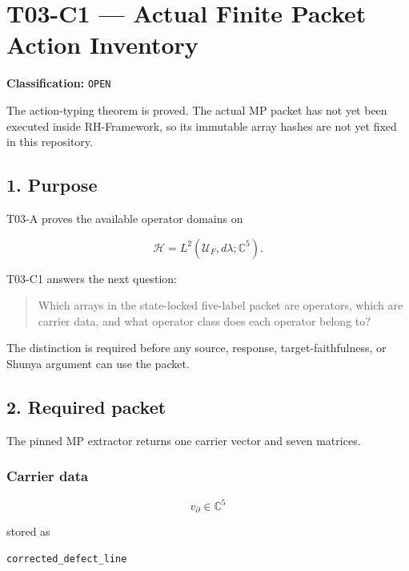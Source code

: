 \hypertarget{t03-c1-actual-finite-packet-action-inventory}{%
\chapter{T03-C1 --- Actual Finite Packet Action Inventory}\label{t03-c1-actual-finite-packet-action-inventory}}

\textbf{Classification:} \texttt{OPEN}

The action-typing theorem is proved. The actual MP packet has not yet been
executed inside RH-Framework, so its immutable array hashes are not yet fixed in
this repository.

\hypertarget{purpose}{%
\section{1. Purpose}\label{purpose}}

T03-A proves the available operator domains on

\[
\mathcal H
=
L^2(\mathcal U_F,d\lambda;\mathbb C^5).
\]

T03-C1 answers the next question:

\begin{quote}
Which arrays in the state-locked five-label packet are operators, which are
carrier data, and what operator class does each operator belong to?
\end{quote}

The distinction is required before any source, response, target-faithfulness,
or Shunya argument can use the packet.

\hypertarget{required-packet}{%
\section{2. Required packet}\label{required-packet}}

The pinned MP extractor returns one carrier vector and seven matrices.

\hypertarget{carrier-data}{%
\subsection{Carrier data}\label{carrier-data}}

\[
v_\partial
\in
\mathbb C^5
\]

stored as

\begin{verbatim}
corrected_defect_line
\end{verbatim}

